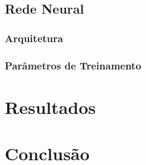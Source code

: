 \documentclass{automatextcc}
\begin{document}

\section{Rede Neural}
\subsection{Arquitetura}
\subsection{Parâmetros de Treinamento}

\chapter{Resultados}


\chapter{Conclusão}





\end{document}
